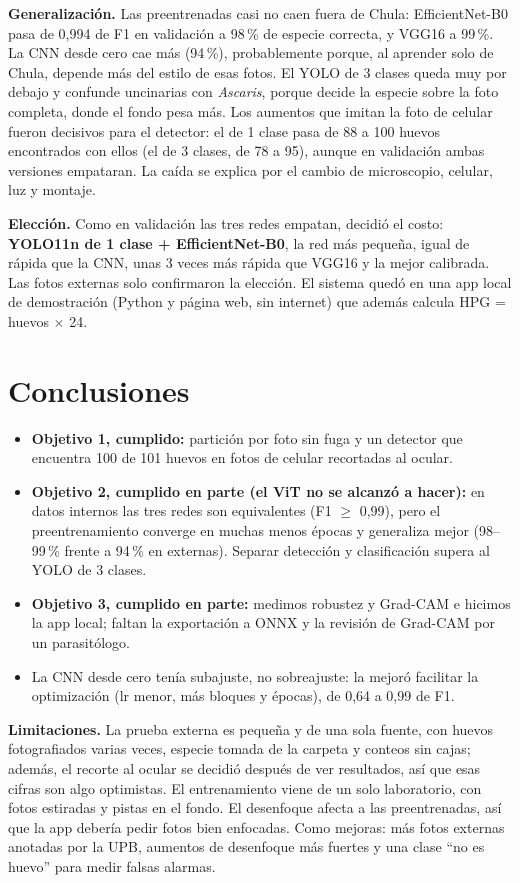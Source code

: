 \documentclass[10pt,letterpaper]{article}
\begin{document}
\textbf{Generalización.} Las preentrenadas casi no caen fuera de Chula: EfficientNet-B0 pasa de 0,994 de F1 en validación a 98\,\% de especie correcta, y VGG16 a 99\,\%. La CNN desde cero cae más (94\,\%), probablemente porque, al aprender solo de Chula, depende más del estilo de esas fotos. El YOLO de 3 clases queda muy por debajo y confunde uncinarias con \textit{Ascaris}, porque decide la especie sobre la foto completa, donde el fondo pesa más. Los aumentos que imitan la foto de celular fueron decisivos para el detector: el de 1 clase pasa de 88 a 100 huevos encontrados con ellos (el de 3 clases, de 78 a 95), aunque en validación ambas versiones empataran. La caída se explica por el cambio de microscopio, celular, luz y montaje.

\textbf{Elección.} Como en validación las tres redes empatan, decidió el costo: \textbf{YOLO11n de 1 clase + EfficientNet-B0}, la red más pequeña, igual de rápida que la CNN, unas 3 veces más rápida que VGG16 y la mejor calibrada. Las fotos externas solo confirmaron la elección. El sistema quedó en una app local de demostración (Python y página web, sin internet) que además calcula HPG = huevos $\times$ 24.

\section{Conclusiones}

\begin{itemize}
  \item \textbf{Objetivo 1, cumplido:} partición por foto sin fuga y un detector que encuentra 100 de 101 huevos en fotos de celular recortadas al ocular.
  \item \textbf{Objetivo 2, cumplido en parte (el ViT no se alcanzó a hacer):} en datos internos las tres redes son equivalentes (F1 $\geq$ 0,99), pero el preentrenamiento converge en muchas menos épocas y generaliza mejor (98--99\,\% frente a 94\,\% en externas). Separar detección y clasificación supera al YOLO de 3 clases.
  \item \textbf{Objetivo 3, cumplido en parte:} medimos robustez y Grad-CAM e hicimos la app local; faltan la exportación a ONNX y la revisión de Grad-CAM por un parasitólogo.
  \item La CNN desde cero tenía subajuste, no sobreajuste: la mejoró facilitar la optimización (lr menor, más bloques y épocas), de 0,64 a 0,99 de F1.
\end{itemize}

\textbf{Limitaciones.} La prueba externa es pequeña y de una sola fuente, con huevos fotografiados varias veces, especie tomada de la carpeta y conteos sin cajas; además, el recorte al ocular se decidió después de ver resultados, así que esas cifras son algo optimistas. El entrenamiento viene de un solo laboratorio, con fotos estiradas y pistas en el fondo. El desenfoque afecta a las preentrenadas, así que la app debería pedir fotos bien enfocadas. Como mejoras: más fotos externas anotadas por la UPB, aumentos de desenfoque más fuertes y una clase ``no es huevo'' para medir falsas alarmas.
\end{document}
